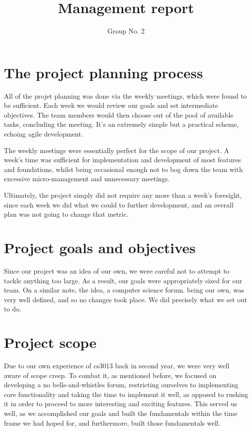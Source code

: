 \documentclass[a4paper, 12pt]{article}
\begin{document}
\title{Management report}
\author{Group No. 2}
\maketitle

	\section{The project planning process}
		\par All of the projet planning was done via the weekly meetings, which were found to be sufficient. 
		Each week we would review our goals and set intermediate objectives. The team members would then choose
		out of the pool of available tasks, concluding the meeting. It's an extremely simple but a practical scheme, echoing agile development.
		\par The weekly meetings were essentially perfect for the scope of our project. A week's time was sufficient
		for implementation and development of most features and foundations, whilst being occasional enough not to
		bog down the team with excessive micro-management and unnecessary meetings.
		\par Ultimately, the project simply did not require any more than a week's foresight, since each week we
		did what we could to further development, and an overall plan was not going to change that metric.

	\section{Project goals and objectives}
		\par Since our project was an idea of our own, we were careful not to attempt to tackle anything too large.
	       	As a result, our goals were appropriately sized for our team. On a similar note, the idea, a computer science forum.
		being our own, was very well defined, and so no changes took place. We did precisely what we set out to do.

	\newpage
	\section{Project scope}
		\par Due to our own experience of cs3013 back in second year, we were very well aware of scope creep. To combat it, as mentioned
		before, we focused on developing a no bells-and-whistles forum, restricting ourselves to implementing core functionality and
		taking the time to implement it well, as opposed to rushing it in order to proceed to more interesting and exciting features. This
		served us well, as we accomplished our goals and built the fundamentals within the time frame we had hoped for, and furthermore, built
		those fundamentals well.
\end{document}
